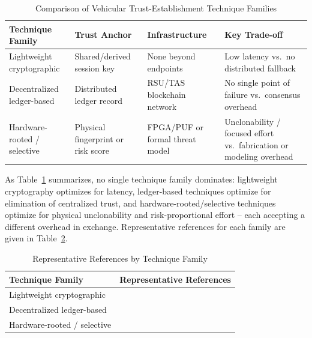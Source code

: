 \documentclass[journal]{IEEEtran}
\begin{document}
	\begin{table}[t]
		\centering
		\caption{Comparison of Vehicular Trust-Establishment Technique Families}
		\label{tab:trust_families}
		\small
		\begin{tabular}{p{1.7cm}p{1.6cm}p{1.6cm}p{2.4cm}}
			\toprule
			\textbf{Technique Family} & \textbf{Trust Anchor} & \textbf{Infrastructure} & \textbf{Key Trade-off} \\
			\midrule
			Lightweight cryptographic & Shared/derived session key & None beyond endpoints & Low latency vs.\ no distributed fallback \\
			\addlinespace
			Decentralized ledger-based & Distributed ledger record & RSU/TAS blockchain network & No single point of failure vs.\ consensus overhead \\
			\addlinespace
			Hardware-rooted / selective & Physical fingerprint or risk score & FPGA/PUF or formal threat model & Unclonability / focused effort vs.\ fabrication or modeling overhead \\
			\bottomrule
		\end{tabular}
	\end{table}
	
	As Table~\ref{tab:trust_families} summarizes, no single technique
	family dominates: lightweight cryptography optimizes for latency,
	ledger-based techniques optimize for elimination of centralized trust,
	and hardware-rooted/selective techniques optimize for physical
	unclonability and risk-proportional effort -- each accepting a
	different overhead in exchange. Representative references for each
	family are given in Table~\ref{tab:trust_families_refs}.
	
	\begin{table}[t]
		\centering
		\caption{Representative References by Technique Family}
		\label{tab:trust_families_refs}
		\small
		\begin{tabular}{p{3.6cm}p{3.6cm}}
			\toprule
			\textbf{Technique Family} & \textbf{Representative References} \\
			\midrule
			Lightweight cryptographic & \cite{ref13,ref14,ref15} \\
			Decentralized ledger-based & \cite{ref16,ref17,ref18,ref19,ref20} \\
			Hardware-rooted / selective & \cite{ref22,ref29,ref30} \\
			\bottomrule
		\end{tabular}
	\end{table}
	
	
\end{document}
